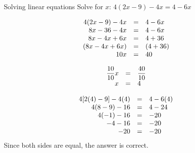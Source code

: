 \begin{wex}
{Solving linear equations }
{Solve for $x$: $4(2x-9)-4x=4-6x$}
{

\begin{equation*}
    \begin{array}{ccl}\hfill 4(2x-9)-4x& =& 4-6x\hfill  \\ 
	\hfill 8x-36-4x& =& 4-6x\hfill   \\ 
	\hfill 8x-4x+6x& =& 4+36\hfill  \\ 
	\hfill (8x-4x+6x)& =& (4+36)\hfill   \\
	\hfill 10x& =& 40\hfill  
    \end{array}
\end{equation*}

\begin{equation*}
    \begin{array}{ccl}
	\hfill \dfrac{10}{10}x& =& \dfrac{40}{10}\hfill\\
	\hfill x& =& 4\hfill  
    \end{array}
\end{equation*}


\begin{equation*}
    \begin{array}{ccl}\hfill 4[2(4)-9]-4(4)& =& 4-6(4)\hfill \\
	\hfill 4(8-9)-16& =& 4-24\hfill \\
	\hfill 4(-1)-16& =& -20\hfill \\
	\hfill -4-16& =& -20\hfill \\
	\hfill -20& =& -20\hfill 
    \end{array}
\end{equation*}
Since both sides are equal, the answer is correct. 
}
\end{wex}

